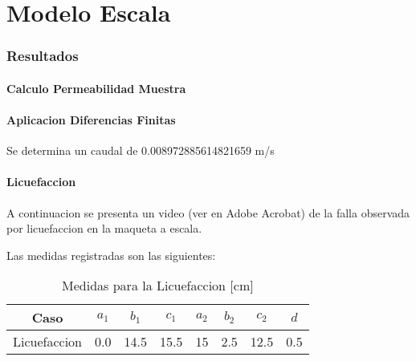 \part{Modelo Escala}

\section{Resultados}

\subsection{Calculo Permeabilidad Muestra}

\subsection{Aplicacion Diferencias Finitas}

Se determina un caudal de 0.008972885614821659 m/s

\subsection{Licuefaccion}

A continuacion se presenta un video (ver en Adobe Acrobat) de la falla observada por licuefaccion en la maqueta a escala.

\begin{center}
\end{center}

Las medidas registradas son las siguientes:

\begin{table}[H]
    \centering
    \begin{tabular}{|c|c|c|c|c|c|c|c|}
    \hline
    Caso & $a_1$ & $b_1$ & $c_1$ & $a_2$ & $b_2$ & $c_2$ & $d$ \\ \hline
    Licuefaccion    & 0.0   & 14.5   & 15.5  & 15  & 2.5   & 12.5  & 0.5 \\ \hline
    \end{tabular}
    \caption{Medidas para la Licuefaccion [cm]}
    \label{tab:medidas}
\end{table}
    

